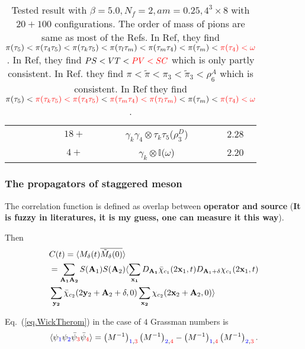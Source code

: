 \begin{table}
\begin{center}
\begin{tabular}{ccc|ccc}
 & & & $18+$ & $\gamma_k\gamma _4\otimes \tau_k\tau _5$($\rho_3^D$) & $2.28$ \\
 & & & $4+$ & $\gamma_k\otimes \mathbb{I}$($\omega$) & $2.20$ \\
\hline
\end{tabular}
\end{center}
\caption{\label{tab:staggeredMeson2}Tested result with $\beta=5.0,N_f=2,am=0.25,4^3\times 8$ with $20+100$ configurations. The order of mass of pions are same as most of the Refs. In Ref, they find $\pi(\tau _5)<\pi(\tau _4\tau _5)<\pi(\tau _k\tau _5)<\pi(\tau _l\tau _m)<\pi(\tau _m\tau _4)<\pi(\tau _m)<\textcolor[rgb]{1,0,0}{\pi(\tau _4)<\omega}$. In Ref, they find $PS<VT<\textcolor[rgb]{1,0,0}{PV<SC}$ which is only partly consistent. In Ref. they find $\pi < \tilde{\pi} < \pi_3 < \tilde{\pi}_3<\rho_6^A$ which is consistent. In Ref they find $\pi(\tau _5)<\textcolor[rgb]{1,0,0}{\pi(\tau _k\tau _5)<\pi(\tau _4\tau _5)}<\textcolor[rgb]{1,0,0}{\pi(\tau _m\tau _4)<\pi(\tau _l\tau _m)}<\pi(\tau _m)<\textcolor[rgb]{1,0,0}{\pi(\tau _4)<\omega}$.}
\end{table} 

\subsubsection{\label{ThePropagatorsOfStaggeredMeson}The propagators of staggered meson}

The correlation function is defined as overlap between \textbf{operator and source} (\textcolor[rgb]{1,0,0}{\textbf{It is fuzzy in literatures, it is my guess, one can measure it this way}}).

Then
\begin{equation}
\begin{split}
&C(t)=\langle M_{\delta}(t) \overline{\tilde{M} _{\delta}(0)}\rangle \\
&= \sum _{\bf A _1 A_2}S({\bf A}_1)S({\bf A}_2)\langle \sum _{\bf x _1}D_{\bf A_1}\bar{\chi}_{c_1}(2{\bf x}_1,t)D_{{\bf A}_1+\delta}\chi _{c_1} (2{\bf x}_1,t) \\
& \sum _{\bf y_2}\bar{\chi} _{c_2} (2{\bf y}_2+{\bf A}_2+\delta,0) \sum _{\bf x _2} \chi_{c_2}(2{\bf x}_2+{\bf A}_2,0)\rangle\\
\end{split}
\end{equation}




Eq.~(\ref{eq.WickTherom}) in the case of $4$ Grassman numbers is
\begin{equation}
\begin{split}
&\langle \psi _{\textcolor[rgb]{0,0,1}{1}}\psi_{\textcolor[rgb]{0,0,1}{2}} \bar{\psi} _{\textcolor[rgb]{1,0,0}{3}} \bar{\psi}_{\textcolor[rgb]{1,0,0}{4}}\rangle = \left(M^{-1}\right)_{\textcolor[rgb]{0,0,1}{1},\textcolor[rgb]{1,0,0}{3}}\left(M^{-1}\right)_{\textcolor[rgb]{0,0,1}{2},\textcolor[rgb]{1,0,0}{4}}- \left(M^{-1}\right)_{\textcolor[rgb]{0,0,1}{1},\textcolor[rgb]{1,0,0}{4}}\left(M^{-1}\right)_{\textcolor[rgb]{0,0,1}{2},\textcolor[rgb]{1,0,0}{3}}.\\
\end{split}
\end{equation}

